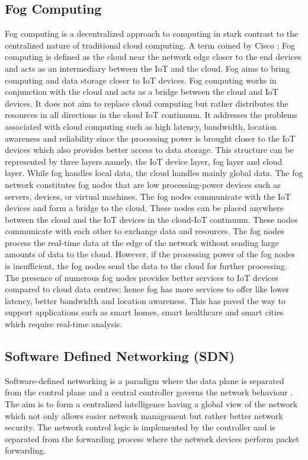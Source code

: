 \documentclass[conference]{IEEEtran}
\begin{document}
\subsection{Fog Computing}
Fog computing is a decentralized approach to computing in stark contrast to the centralized nature of traditional cloud computing. A term coined by Cisco \cite{cisco}; Fog computing is defined as the cloud near the network edge closer to the end devices and acts as an intermediary between the IoT and the cloud\cite{donno}. Fog aims to bring computing and data storage closer to IoT devices. Fog computing works in conjunction with the cloud and acts as a bridge between the cloud and IoT devices\cite{verma}. It does not aim to replace cloud computing but rather distributes the resources in all directions in the cloud IoT continuum. It addresses the problems associated with cloud computing such as high latency, bandwidth, location awareness and reliability since the processing power is brought closer to the IoT devices which also provides better access to data storage. This structure can be represented by three layers namely, the IoT device layer, fog layer and cloud layer. While fog handles local data, the cloud handles mainly global data.  The fog network constitutes fog nodes that are low processing-power devices such as servers, devices, or virtual machines. The fog nodes communicate with the IoT devices and form a bridge to the cloud. These nodes can be placed anywhere between the cloud and the IoT devices in the cloud-IoT continuum. These nodes communicate with each other to exchange data and resources. The fog nodes process the real-time data at the edge of the network without sending large amounts of data to the cloud. However, if the processing power of the fog nodes is insufficient, the fog nodes send the data to the cloud for further processing. The presence of numerous fog nodes provides better services to IoT devices compared to cloud data centres; hence fog has more services to offer like lower latency, better bandwidth and location awareness. This has paved the way to support applications such as smart homes, smart healthcare and smart cities which require real-time analysis.

\subsection{Software Defined Networking (SDN)}
Software-defined networking is a paradigm where the data plane is separated from the control plane and a central controller governs the network behaviour \cite{benz}. The aim is to form a centralized intelligence having a global view of the network which not only allows easier network management but rather better network security. The network control logic is implemented by the controller and is separated from the forwarding process where the network devices perform packet forwarding. 
\end{document}
